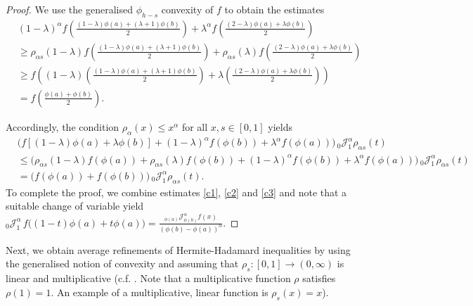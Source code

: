 \documentclass[10pt]{article}
\begin{document}
\begin{proof}
We use the generalised $\phi_{h-s}$ convexity of $f$ to obtain the estimates
\begin{align}
&(1-\lambda)^\alpha f\left( \frac{(1-\lambda)\phi(a)+(\lambda+1)\phi(b)}{2} \right) +\lambda^\alpha f\left( \frac{(2-\lambda)\phi(a) +\lambda\phi(b)}{2}  \right)  \nonumber
\\& \geq \rho_{\alpha s}(1-\lambda) f\left( \frac{(1-\lambda)\phi(a)+(\lambda+1)\phi(b)}{2} \right) +\rho_{\alpha s}(\lambda) f\left( \frac{(2-\lambda)\phi(a) +\lambda\phi(b)}{2}  \right)  \nonumber
\\& \geq f\left( (1-\lambda) \left( \frac{(1-\lambda)\phi(a) +(\lambda+1)\phi(b)}{2} \right) +\lambda\left(  \frac{(2-\lambda)\phi(a) +\lambda\phi(b)}{2} \right) \right)  \nonumber
\\&=   f\left( \frac{\phi(a)+\phi(b)}{2} \right). \label{c2}
\end{align}


 Accordingly, the condition $\rho_{\alpha}(x) \leq x^\alpha$ for all $x,s \in[0,1]$ yields
\begin{align}
&\Big( f[(1-\lambda)\phi(a)+\lambda\phi(b)] +(1-\lambda)^\alpha f(\phi(b)) +\lambda^\alpha f(\phi(a))  \Big)\,{}_0\mathcal{J}^\alpha_1 \rho_{\alpha s}(t)  \nonumber
\\&\leq \Big(\rho_{\alpha s}(1-\lambda) f(\phi(a)) +\rho_{\alpha s}(\lambda) f(\phi(b)) +(1-\lambda)^\alpha f(\phi(b)) +\lambda^\alpha f(\phi(a))   \Big) \,{}_0\mathcal{J}^\alpha_1 \rho_{\alpha s}(t)  \nonumber
\\&= \Big( f(\phi(a)) +f(\phi(b)) \Big) \,{}_0\mathcal{J}^\alpha_1 \rho_{\alpha s}(t) . \label{c3}
\end{align}
To complete the proof, we combine estimates \eqref{c1}, \eqref{c2} and \eqref{c3} and note that a suitable change of variable yield ${}_0 \mathcal{J}_1^\alpha\, f\big((1-t)\phi(a) +t\phi(a)  \big)=  \frac{ {}_{\phi(a)}\mathcal{J}_{\phi(b)}^\alpha f(x) }{(\phi(b)-\phi(a))^\alpha} $.

\end{proof}










Next, we obtain average refinements of Hermite-Hadamard inequalities by using the generalised notion of convexity  and assuming that $\rho_{s}:[0,1]\rightarrow (0,\infty)$ is linear and multiplicative (c.f. 
\cite{fech, anji, hoff, roit}. Note that a multiplicative function $\rho$ satisfies $\rho(1)=1$. An example of a multiplicative, linear function is $\rho_s(x)=x$).
\end{document}
